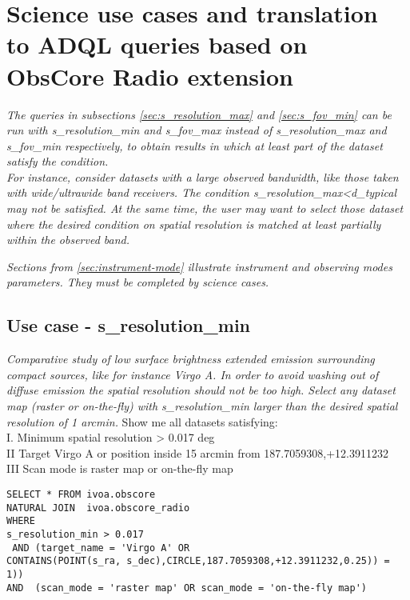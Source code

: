\section{Science use cases and translation to ADQL queries  based on ObsCore Radio extension  }
\label{ADQLusecases}


\textit{ The  queries in subsections \ref{sec:s_resolution_max} and \ref{sec:s_fov_min}
can be run with s\_resolution\_min and s\_fov\_max instead of s\_resolution\_max and 
 s\_fov\_min respectively, to obtain results in which at least part of the dataset satisfy the condition.\\
For instance, consider datasets with a large observed bandwidth, like those taken with wide/ultrawide band receivers.
The condition s\_resolution\_max<d\_typical may not be satisfied. At the same time, the user may want to select those 
dataset where the desired condition on spatial resolution is matched at least partially  within the observed band.}

\textit{Sections from \ref{sec:instrument-mode} illustrate instrument and observing modes parameters. They must  be completed by science cases.}

\subsection{Use case - s\_resolution\_min}
\label{sec:s_resolution_min}
\textit{Comparative study of low surface brightness extended emission surrounding compact sources, like for instance Virgo A.
In order to avoid washing out of diffuse emission the spatial resolution should not be too high.
Select any dataset map (raster or on-the-fly) with s\_resolution\_min larger than the desired spatial resolution of 1 arcmin.}
Show me all datasets satisfying: \\
I. Minimum spatial resolution > 0.017 deg \\
II Target Virgo A or position inside 15 arcmin from 187.7059308,+12.3911232 \\
III Scan mode is raster map or on-the-fly map

\begin{verbatim}
SELECT * FROM ivoa.obscore
NATURAL JOIN  ivoa.obscore_radio 
WHERE
s_resolution_min > 0.017 
 AND (target_name = 'Virgo A' OR
CONTAINS(POINT(s_ra, s_dec),CIRCLE,187.7059308,+12.3911232,0.25)) = 1)) 
AND  (scan_mode = 'raster map' OR scan_mode = 'on-the-fly map')
\end{verbatim}

